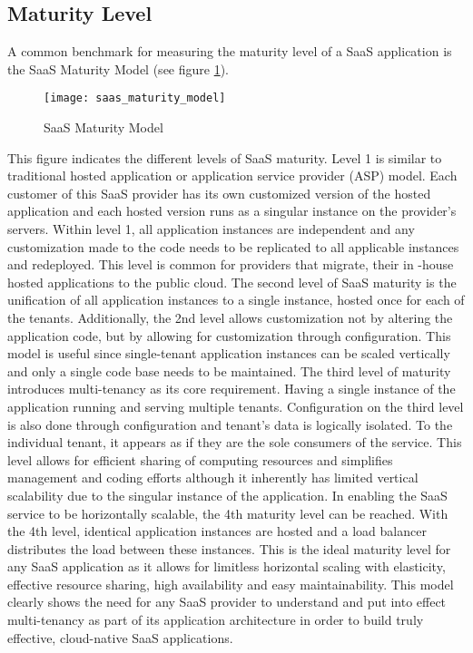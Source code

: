 \subsection{Maturity Level}

A common benchmark for measuring the maturity level of a SaaS application is the SaaS Maturity Model (see figure \ref{fig:saas_maturity_model}).


\begin{figure}
\centering
\texttt{[image: saas\_maturity\_model]}
\caption{SaaS Maturity Model}
\label{fig:saas_maturity_model}
\end{figure}


This figure indicates the different levels of SaaS maturity. Level 1 is similar to traditional hosted application or application service provider (ASP) model. Each customer of this SaaS provider has its own customized version of the hosted application and each hosted version runs as a singular instance on the provider's servers. Within level 1, all application instances are independent and any customization made to the code needs to be replicated to all applicable instances and redeployed. This level is common for providers that migrate, their in -house hosted applications to the public cloud. The second level of SaaS maturity is the unification of all application instances to a single instance, hosted once for each of the tenants. Additionally, the 2nd level allows customization not by altering the application code, but by allowing for customization through configuration. This model is useful since single-tenant application instances can be scaled vertically and only a single code base needs to be maintained. The third level of maturity introduces multi-tenancy as its core requirement. Having a single instance of the application running and serving multiple tenants. Configuration on the third level is also done through configuration and tenant's data is logically isolated. To the individual tenant, it appears as if they are the sole consumers of the service. This level allows for efficient sharing of computing resources and simplifies management and coding efforts although it inherently has limited vertical scalability due to the singular instance of the application. In enabling the SaaS service to be horizontally scalable, the 4th maturity level can be reached. With the 4th level, identical application instances are hosted and a load balancer distributes the load between these instances. This is the ideal maturity level for any SaaS application as it allows for limitless horizontal scaling with elasticity, effective resource sharing, high availability  and easy maintainability. This model clearly shows the need for any SaaS provider to understand and put into effect multi-tenancy as part of its application architecture in order to build truly effective, cloud-native SaaS applications.


